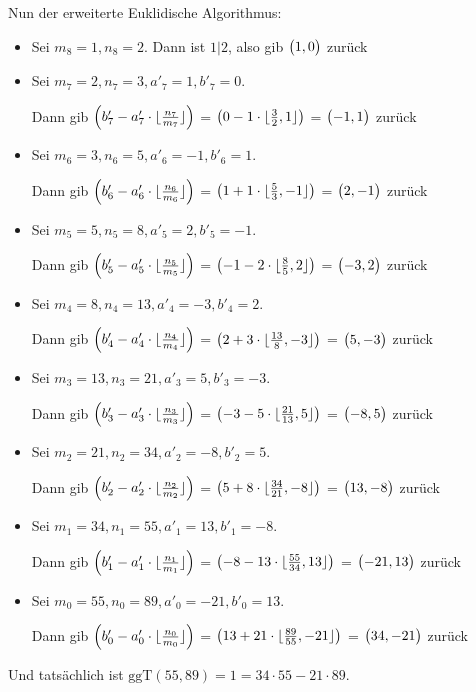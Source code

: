 \documentclass{scrreprt}
\newcommand{\ggT}[0]{\text{ggT}}
\DeclarePairedDelimiter{\floor}{\lfloor}{\rfloor}
\begin{document}
\begin{enumerate}[(a)]
\begin{enumerate}[(i)]
    Nun der erweiterte Euklidische Algorithmus:
    \begin{itemize}
    \item Sei $m_8 = 1, n_8 = 2$.
      Dann ist $1|2$, also gib $\qty\big(1, 0)$ zurück
    \item Sei $m_7 = 2, n_7 = 3, a'_7 = 1, b'_7 = 0$.

      Dann gib $\qty(b'_7 - a'_7 \cdot \floor{\frac{n_7}{m_7}})$ =
      $\qty(0 - 1 \cdot \floor{\frac{3}{2}, 1})$ =
      $\qty\big(-1, 1)$ zurück
    \item Sei $m_6 = 3, n_6 = 5, a'_6 = -1, b'_6 = 1$.

      Dann gib $\qty(b'_6 - a'_6 \cdot \floor{\frac{n_6}{m_6}})$ =
      $\qty(1 + 1 \cdot \floor{\frac{5}{3}, -1})$ =
      $\qty\big(2, -1)$ zurück
    \item Sei $m_5 = 5, n_5 = 8, a'_5 = 2, b'_5 = -1$.

      Dann gib $\qty(b'_5 - a'_5 \cdot \floor{\frac{n_5}{m_5}})$ =
      $\qty(-1 - 2 \cdot \floor{\frac{8}{5}, 2})$ =
      $\qty\big(-3, 2)$ zurück
    \item Sei $m_4 = 8, n_4 = 13, a'_4 = -3, b'_4 = 2$.

      Dann gib $\qty(b'_4 - a'_4 \cdot \floor{\frac{n_4}{m_4}})$ =
      $\qty(2 + 3 \cdot \floor{\frac{13}{8}, -3})$ =
      $\qty\big(5, -3)$ zurück
    \item Sei $m_3 = 13, n_3 = 21, a'_3 = 5, b'_3 = -3$.

      Dann gib $\qty(b'_3 - a'_3 \cdot \floor{\frac{n_3}{m_3}})$ =
      $\qty(-3 - 5 \cdot \floor{\frac{21}{13}, 5})$ =
      $\qty\big(-8, 5)$ zurück
    \item Sei $m_2 = 21, n_2 = 34, a'_2 = -8, b'_2 = 5$.

      Dann gib $\qty(b'_2 - a'_2 \cdot \floor{\frac{n_2}{m_2}})$ =
      $\qty(5 + 8 \cdot \floor{\frac{34}{21}, -8})$ =
      $\qty\big(13, -8)$ zurück
    \item Sei $m_1 = 34, n_1 = 55, a'_1 = 13, b'_1 = -8$.

      Dann gib $\qty(b'_1 - a'_1 \cdot \floor{\frac{n_1}{m_1}})$ =
      $\qty(-8 - 13 \cdot \floor{\frac{55}{34}, 13})$ =
      $\qty\big(-21, 13)$ zurück
    \item Sei $m_0 = 55, n_0 = 89, a'_0 = -21, b'_0 = 13$.

      Dann gib $\qty(b'_0 - a'_0 \cdot \floor{\frac{n_0}{m_0}})$ =
      $\qty(13 + 21 \cdot \floor{\frac{89}{55}, -21})$ =
      $\qty\big(34, -21)$ zurück
    \end{itemize}
    Und tatsächlich ist $\ggT(55, 89) = 1 = 34 \cdot 55 - 21 \cdot 89$.
  \end{enumerate}
\end{enumerate}
\end{document}
